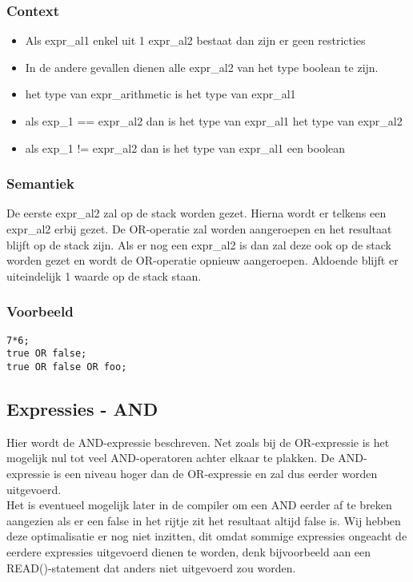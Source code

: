 \documentclass[]{article}
\begin{document}
\subsubsection{Context}
\begin{itemize}
\item Als expr\_al1 enkel uit 1 expr\_al2 bestaat dan zijn er geen restricties
\item In de andere gevallen dienen alle expr\_al2 van het type boolean te zijn.
\item het type van expr\_arithmetic is het type van expr\_al1
\item als exp\_1 == expr\_al2 dan is het type van expr\_al1 het type van expr\_al2
\item als exp\_1 != expr\_al2 dan is het type van expr\_al1 een boolean
\end{itemize}
\subsubsection{Semantiek}
De eerste expr\_al2 zal op de stack worden gezet. Hierna wordt er telkens een expr\_al2 erbij gezet. De OR-operatie zal worden aangeroepen en het resultaat blijft op de stack zijn. Als er nog een expr\_al2 is dan zal deze ook op de stack worden gezet en wordt de OR-operatie opnieuw aangeroepen. Aldoende blijft er uiteindelijk 1 waarde op de stack staan.
\subsubsection{Voorbeeld}
\begin{lstlisting}[style=SELMA]
7*6;
true OR false;
true OR false OR foo;
\end{lstlisting}

\subsection{Expressies - AND}
Hier wordt de AND-expressie beschreven. Net zoals bij de OR-expressie is het mogelijk nul tot veel AND-operatoren achter elkaar te plakken. De AND-expressie is een niveau hoger dan de OR-expressie en zal dus eerder worden uitgevoerd. \\
Het is eventueel mogelijk later in de compiler om een AND eerder af te breken aangezien als er een false in het rijtje zit het resultaat altijd false is. Wij hebben deze optimalisatie er nog niet inzitten, dit omdat sommige expressies ongeacht de eerdere expressies uitgevoerd dienen te worden, denk bijvoorbeeld aan een READ()-statement dat anders niet uitgevoerd zou worden.
\end{document}
